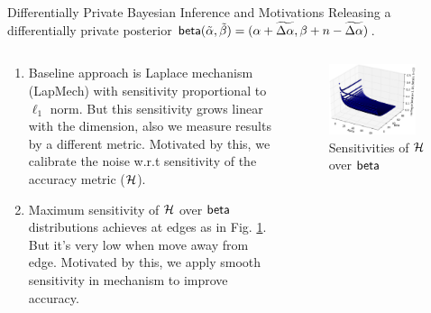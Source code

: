 \documentclass[final,hyperref={pdfpagelabels=false}]{beamer}
\begin{document}
\begin{frame}[t]
\begin{columns}[t]
\begin{column}{.485\textwidth}
\begin{block}{Differentially Private Bayesian Inference and Motivations}
Releasing a differentially private posterior $\mathsf{beta} (\tilde\alpha,\tilde\beta)=(\alpha +  \widetilde{\Delta \alpha},\beta + n - \widetilde{\Delta \alpha})$.
\begin{columns} %
\begin{column}{.69\textwidth}
\begin{enumerate}
  \item  Baseline approach is Laplace mechanism (LapMech) with sensitivity proportional to $\ell_1$ norm. But this sensitivity grows linear with the dimension, also we measure results by a different metric. Motivated by this, we calibrate the noise w.r.t sensitivity of the accuracy metric ($\mathcal{H}$). %
  \item Maximum sensitivity of $\mathcal{H}$ over $\mathsf{beta}$ distributions achieves at edges as in Fig. \ref{fig_sensitivity}. But it's very low when move away from edge. Motivated by this, we apply smooth sensitivity in mechanism to improve accuracy.
\end{enumerate}
\end{column}
\begin{column}{.28\textwidth}
\begin{figure}[ht]
\centering
\includegraphics[width=0.9\textwidth]{poster_0.eps}
\caption{\footnotesize{Sensitivities of $\mathcal{H}$ over $\mathsf{beta}$}}
\label{fig_sensitivity}
\end{figure}
\end{column}
\end{columns}


\end{block}
\end{column}
\end{columns}
\end{frame}
\end{document}
